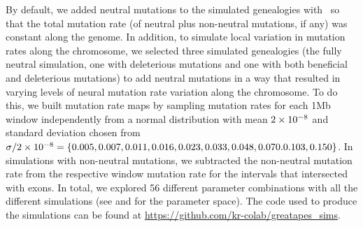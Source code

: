 By default, we added neutral mutations to the simulated genealogies with \msprime ~so that the total mutation rate
(of neutral plus non-neutral mutations, if any) was constant along the genome.
In addition, to simulate local variation in mutation rates along the chromosome, 
we selected three simulated genealogies (the fully neutral simulation, one with deleterious mutations and one with both beneficial and deleterious mutations)
to add neutral mutations in a way that resulted in varying levels of neural mutation rate variation along the chromosome.
To do this, we built mutation rate maps by sampling mutation rates for each 1Mb window independently from a normal distribution with mean ${2}\times10^{-8}$
and standard deviation chosen from $\sigma / {2}\times10^{-8} = \{ 0.005, 0.007, 0.011, 0.016, 0.023, 0.033,\allowbreak 0.048, 0.070. 0.103, 0.150 \}$.
In simulations with non-neutral mutations, we subtracted the non-neutral mutation rate from the respective window mutation rate for the intervals that intersected with exons.
In total, we explored 56 different parameter combinations with all the different simulations (see  and  for the parameter space).
The code used to produce the simulations can be found at \url{https://github.com/kr-colab/greatapes_sims}.

